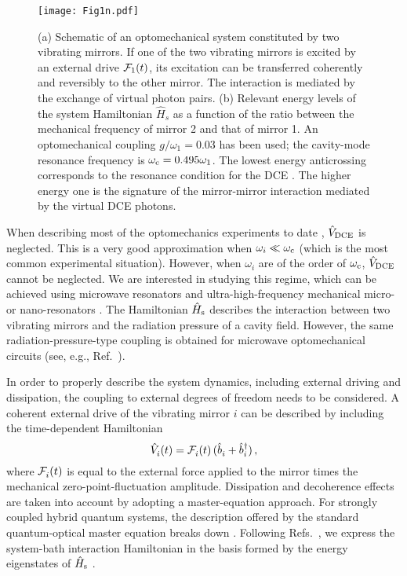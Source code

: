 \documentclass[aps,pra,twocolumn,floatfix,longbibliography, superscriptaddress]{revtex4-1}
\newcommand{\be}{\begin{equation}}
\newcommand{\ee}{\end{equation}}
\begin{document}
\begin{figure}\label{fig:1}
	\centering
	\texttt{[image: Fig1n.pdf]}
	\caption{(a) Schematic of an optomechanical system constituted by two vibrating mirrors. If one of the two vibrating mirrors is  excited by an external drive ${\cal F}_1(t)$, its excitation can be transferred coherently and reversibly to the other mirror. The interaction is mediated by the exchange of virtual photon pairs.
		(b) Relevant energy levels of the system Hamiltonian $\hat H_s$ as a function of the ratio between the  mechanical frequency of mirror 2 and that of mirror 1. An optomechanical coupling $g/\omega_{1} = 0.03$ has been used; the cavity-mode resonance frequency is $\omega_{\rm c}  = 0.495\omega_1$. The lowest energy   anticrossing corresponds to the resonance condition for the DCE \cite{Macri2017}. The higher energy one is the signature of the mirror-mirror interaction mediated by the virtual DCE  photons.
		\label{fig:1}}
\end{figure}
	When describing most of the optomechanics experiments to date \cite{Aspelmeyer2014}, $\hat V_{\rm DCE}$ is  neglected. This is a very good approximation when
	 $\omega_i \ll \omega_{\rm c}$ (which is the most common experimental situation). However, when
	 $\omega_i$ are of the order of $\omega_{\rm c}$, $\hat V_{\rm DCE}$ cannot be neglected. We are interested in studying this regime, which can be achieved using microwave resonators and ultra-high-frequency mechanical micro- or nano-resonators \cite{OConnell2010, Rouxinol2016}. 	
	The Hamiltonian $\hat H_{\rm s}$ describes the interaction between two vibrating mirrors and the radiation pressure of a cavity field. However, the same radiation-pressure-type coupling is obtained for microwave optomechanical circuits (see, e.g., Ref.~\cite{Heikkila2014}).
	
	In order to properly describe the system dynamics, including external driving and dissipation, the coupling to external degrees of freedom needs to be considered.
    A coherent external drive of the vibrating mirror $i$ can be described by including the time-dependent Hamiltonian
    \be\label{F}
    \hat V^{}_{i}(t) = {\cal F}^{}_i(t)\, (\hat b^{}_i + \hat b_i^\dag)\, ,
    \ee
where ${\cal F}^{}_i(t)$ is equal to the external force applied to the mirror times the mechanical zero-point-fluctuation amplitude.
	Dissipation and decoherence effects are taken into account by adopting a master-equation approach. For strongly coupled hybrid quantum systems, the description offered by the standard quantum-optical master equation breaks down \cite{Beaudoin2011,Hu2015}. 
Following Refs.~\cite{Breuer2002,Ma2015, Hu2015}, we express the system-bath interaction Hamiltonian in the basis formed by the energy eigenstates of $\hat H_{\rm s}$ 
\cite{Macri2017}.
\end{document}
